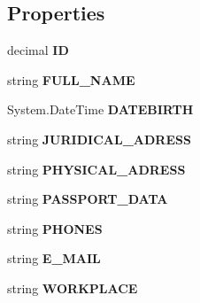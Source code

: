 \subsection*{Properties}
\begin{CompactItemize}
\item 
decimal \textbf{ID}\hspace{0.3cm}{\tt  [get, set]}\label{class_automatic_medical_system_1_1_data_set1_1_1_p_a_t_i_e_n_t_s_row_43d5b30cbc2e6cbcef09e2f4e1151c55}

\item 
string \textbf{FULL\_\-NAME}\hspace{0.3cm}{\tt  [get, set]}\label{class_automatic_medical_system_1_1_data_set1_1_1_p_a_t_i_e_n_t_s_row_d91b11f4ff33de3b06a24c717a2f9061}

\item 
System.DateTime \textbf{DATEBIRTH}\hspace{0.3cm}{\tt  [get, set]}\label{class_automatic_medical_system_1_1_data_set1_1_1_p_a_t_i_e_n_t_s_row_010cfa4773549c16c79c1ecea7ada3f3}

\item 
string \textbf{JURIDICAL\_\-ADRESS}\hspace{0.3cm}{\tt  [get, set]}\label{class_automatic_medical_system_1_1_data_set1_1_1_p_a_t_i_e_n_t_s_row_06c22ef454e559ef401fba8c8c6fa942}

\item 
string \textbf{PHYSICAL\_\-ADRESS}\hspace{0.3cm}{\tt  [get, set]}\label{class_automatic_medical_system_1_1_data_set1_1_1_p_a_t_i_e_n_t_s_row_31a28522bad808f68df98e709f1a06bc}

\item 
string \textbf{PASSPORT\_\-DATA}\hspace{0.3cm}{\tt  [get, set]}\label{class_automatic_medical_system_1_1_data_set1_1_1_p_a_t_i_e_n_t_s_row_61f19261c5bfeb868160ba4f60e14f2e}

\item 
string \textbf{PHONES}\hspace{0.3cm}{\tt  [get, set]}\label{class_automatic_medical_system_1_1_data_set1_1_1_p_a_t_i_e_n_t_s_row_688cc8af95d8489a9f3c9fc22639be39}

\item 
string \textbf{E\_\-MAIL}\hspace{0.3cm}{\tt  [get, set]}\label{class_automatic_medical_system_1_1_data_set1_1_1_p_a_t_i_e_n_t_s_row_0841792bfe662cf7d5529e5f4eae1bcc}

\item 
string \textbf{WORKPLACE}\hspace{0.3cm}{\tt  [get, set]}\label{class_automatic_medical_system_1_1_data_set1_1_1_p_a_t_i_e_n_t_s_row_d186af859f3c492411866d50b83b61a5}

\end{CompactItemize}


